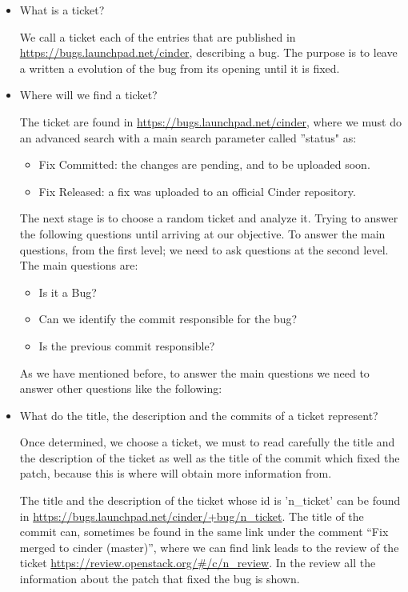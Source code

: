 \documentclass[a4paper]{article}
\begin{document}
\begin{itemize}
\item What is a ticket?

We call a ticket each of the entries that are published in \url{https://bugs.launchpad.net/cinder}, describing a bug. The purpose is to leave a written a evolution of the bug from its opening until it is fixed.


\item Where will we find a ticket?

The ticket are found in \url{https://bugs.launchpad.net/cinder}, where we must do an advanced search with a main search parameter called ”status" as:
\begin{itemize}
    \item Fix Committed: the changes are pending, and to be uploaded soon.
    \item Fix Released: a fix was uploaded to an official Cinder repository.
\end{itemize}

The next stage is to choose a random ticket and analyze it. Trying to answer the following questions until arriving at our objective. To answer the main questions, from the first level; we need to ask questions at the second level.
The main questions are:
\begin{itemize}
    \item Is it a Bug?
    \item Can we identify the commit responsible for the bug?
    \item Is the previous commit responsible?
\end{itemize}

As we have mentioned before, to answer the main questions we need to answer other questions like the following:

\item What do the title, the description and the commits of a ticket represent?

Once determined, we choose a ticket, we must to read carefully the title and the description of the ticket as well as the title of the commit which fixed the patch, because this is where will obtain more information from.

The title and the description of the ticket whose id is 'n\_ticket' can be found in \url{https://bugs.launchpad.net/cinder/+bug/n_ticket}. The title of the commit can, sometimes be found in the same link under the comment “Fix merged to cinder (master)”, where we can find link leads to the review of the ticket \url{https://review.openstack.org/#/c/n_review}. In the review all the information about the patch that fixed the bug is shown.


\end{itemize}
\end{document}
